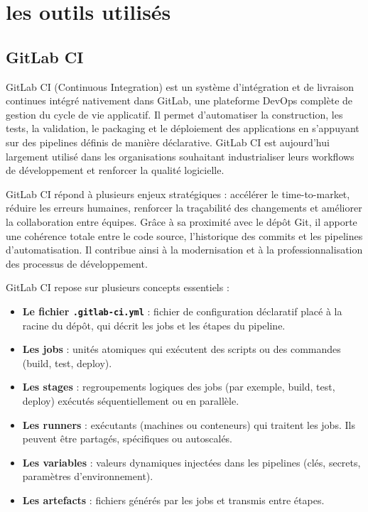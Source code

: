 \section{les outils utilisés}
\subsection{GitLab CI}

GitLab CI (Continuous Integration) est un système d’intégration et de livraison continues intégré nativement dans GitLab, une plateforme DevOps complète de gestion du cycle de vie applicatif. Il permet d’automatiser la construction, les tests, la validation, le packaging et le déploiement des applications en s’appuyant sur des pipelines définis de manière déclarative. GitLab CI est aujourd’hui largement utilisé dans les organisations souhaitant industrialiser leurs workflows de développement et renforcer la qualité logicielle.

GitLab CI répond à plusieurs enjeux stratégiques  : accélérer le time-to-market, réduire les erreurs humaines, renforcer la traçabilité des changements et améliorer la collaboration entre équipes. Grâce à sa proximité avec le dépôt Git, il apporte une cohérence totale entre le code source, l’historique des commits et les pipelines d’automatisation. Il contribue ainsi à la modernisation et à la professionnalisation des processus de développement.

GitLab CI repose sur plusieurs concepts essentiels  :
\begin{itemize}
	\item \textbf{Le fichier \texttt{.gitlab-ci.yml}}  : fichier de configuration déclaratif placé à la racine du dépôt, qui décrit les jobs et les étapes du pipeline.
	\item \textbf{Les jobs}  : unités atomiques qui exécutent des scripts ou des commandes (build, test, deploy).
	\item \textbf{Les stages}  : regroupements logiques des jobs (par exemple, build, test, deploy) exécutés séquentiellement ou en parallèle.
	\item \textbf{Les runners}  : exécutants (machines ou conteneurs) qui traitent les jobs. Ils peuvent être partagés, spécifiques ou autoscalés.
	\item \textbf{Les variables}  : valeurs dynamiques injectées dans les pipelines (clés, secrets, paramètres d’environnement).
	\item \textbf{Les artefacts}  : fichiers générés par les jobs et transmis entre étapes.
\end{itemize}

